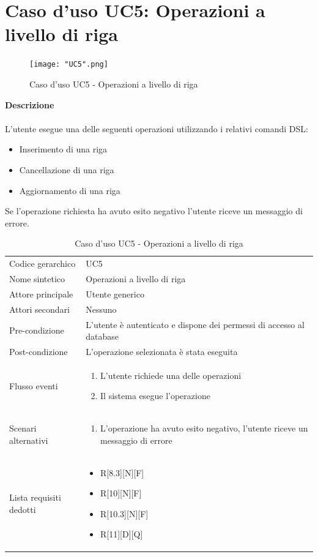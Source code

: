 \documentclass[a4paper]{report}
\begin{document}
	 \section{Caso d'uso UC5: Operazioni a livello di riga}
	 \begin{figure}[H]
			\centering
			\texttt{[image: "UC5".png]}
			\caption{Caso d'uso UC5 - Operazioni a livello di riga}
		\end{figure}
	 \textbf{Descrizione} \\ \\
	 L'utente esegue una delle seguenti operazioni utilizzando i relativi comandi DSL:
	 \begin{itemize}
	 	\item Inserimento di una riga
	 	\item Cancellazione di una riga
	 	\item Aggiornamento di una riga
	 \end{itemize}
	 Se l'operazione richiesta ha avuto esito negativo l'utente riceve un messaggio di errore.
		\begin{table}[H]
		\begin{tabularx}{\textwidth}{X | X}\toprule
			\rowcolor{orange!65}Codice gerarchico & UC5\\
			Nome sintetico & Operazioni a livello di riga\\
			\rowcolor{orange!65}Attore principale & Utente generico\\
			Attori secondari & Nessuno \\
			\rowcolor{orange!65}Pre-condizione & L'utente è autenticato e dispone dei permessi di accesso
			al database\\
			Post-condizione & L'operazione selezionata è stata eseguita\\
			\rowcolor{orange!65}Flusso eventi & \begin{enumerate}
			\item L'utente richiede una delle operazioni
			\item Il sistema esegue l'operazione
			\end{enumerate} \\
			Scenari alternativi & \begin{enumerate}
			\item L'operazione ha avuto esito negativo, l'utente riceve un messaggio di errore
			\end{enumerate} \\
			\rowcolor{orange!65}Lista requisiti dedotti & \begin{itemize}
				\item R[8.3][N][F]
				\item R[10][N][F]
				\item R[10.3][N][F]
				\item R[11][D][Q]
				\end{itemize} \\
			\bottomrule
		\end{tabularx}
		\caption{Caso d'uso UC5 - Operazioni a livello di riga}
	 \end{table}
\end{document}

